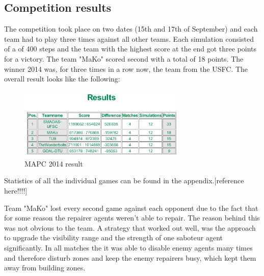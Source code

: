 \subsection{Competition results}
The competition took place on two dates (15th and 17th of September) and each team had to play three times against all other teams. Each simulation consisted of a of 400 steps and the team with the highest score at the end got three points for a victory. The team "MaKo" scored second with a total of 18 points. The winner 2014 was, for three times in a row now, the team from the USFC. The overall result looks like the following:
\begin{figure}[h]
	\centering
	\includegraphics[width=300px]{images/con_result.png}
	\caption{MAPC 2014 result}
	\label{dis:result}
\end{figure}
Statistics of all the individual games can be found in the appendix.[reference here!!!!]

Team "MaKo" lost every second game against each opponent due to the fact that for some reason the repairer agents weren't able to repair. The reason behind this was not obvious to the team. A strategy that worked out well, was the approach to upgrade the visibility range and the strength of one saboteur agent significantly. In all matches the it was able to disable enemy agents many times and therefore disturb zones and keep the enemy repairers busy, which kept them away from building zones.

